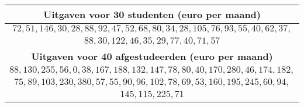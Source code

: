 

\begin{center}
    \begin{tabular}{c}
        \toprule
            \textbf{Uitgaven voor 30 studenten (euro per maand)} \\
        \midrule
            $72, 51, 146, 30, 28, 88, 92, 47, 52, 68, 80, 34, 28, 105, 76, 93, 55, 40, 62, 37,$ \\
            $88, 30, 122, 46, 35, 29, 77, 40, 71, 57$ \\
        \midrule
            \textbf{Uitgaven voor 40 afgestudeerden (euro per maand)} \\
        \midrule
            $88, 130, 255, 56, 0, 38, 167, 188, 132, 147, 78, 80, 40, 170, 280, 46, 174, 182,$ \\
            $75, 89, 103, 230, 380, 57, 55, 90, 96, 102, 78, 69, 53, 160, 195, 245, 60, 94,$ \\
            $145, 115, 225, 71$ \\
        \bottomrule
    \end{tabular}
\end{center}

